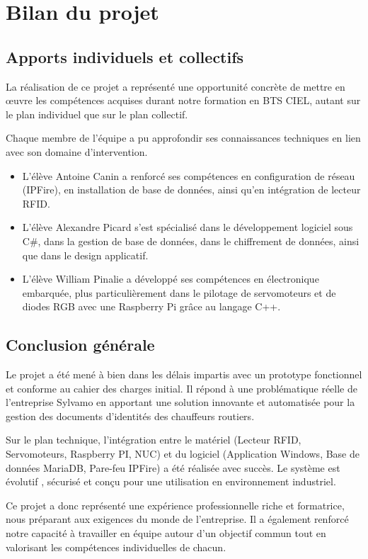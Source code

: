 \documentclass[main.tex]{subfiles}
\begin{document}
\section{Bilan du projet}

\subsection{Apports individuels et collectifs}

\quad La réalisation de ce projet a représenté une opportunité concrète de mettre en œuvre les compétences acquises durant notre formation en BTS CIEL, autant sur le plan individuel que sur le plan collectif.

Chaque membre de l’équipe a pu approfondir ses connaissances techniques en lien avec son domaine d’intervention.

\begin{itemize}

\item L’élève Antoine Canin a renforcé ses compétences en configuration de réseau (IPFire), en installation de base de données, ainsi qu’en intégration de lecteur RFID.
\item L'élève Alexandre Picard s’est spécialisé dans le développement logiciel sous C\#, dans la gestion de base de données, dans le chiffrement de données, ainsi que dans le design applicatif.
\item L’élève William Pinalie a développé ses compétences en électronique embarquée, plus particulièrement dans le pilotage de servomoteurs et de diodes RGB avec une Raspberry Pi grâce au langage C++.

\end{itemize}

\subsection{Conclusion générale}

\quad Le projet a été mené à bien dans les délais impartis avec un prototype fonctionnel et conforme au cahier des charges initial. Il répond à une problématique réelle de l’entreprise Sylvamo en apportant une solution innovante et automatisée pour la gestion des documents d’identités des chauffeurs routiers. 

Sur le plan technique, l’intégration entre le matériel (Lecteur RFID, Servomoteurs, Raspberry PI, NUC) et du logiciel (Application Windows, Base de données MariaDB, Pare-feu IPFire) a été réalisée avec succès. Le système est évolutif , sécurisé et conçu pour une utilisation en environnement industriel.

Ce projet a donc représenté une expérience professionnelle riche et formatrice, nous préparant aux exigences du monde de l’entreprise. Il a également renforcé notre capacité à travailler en équipe autour d’un objectif commun tout en valorisant les compétences individuelles de chacun.



\newpage
\end{document}
